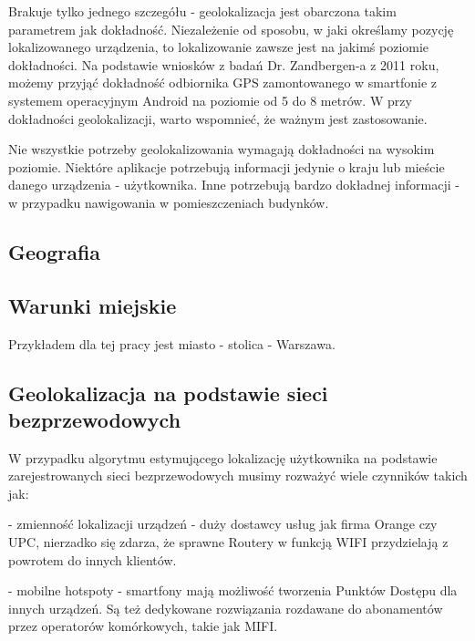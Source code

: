 Brakuje tylko jednego szczegółu - geolokalizacja jest obarczona takim parametrem jak dokładność. Niezależenie od sposobu, w jaki określamy pozycję lokalizowanego urządzenia, to lokalizowanie zawsze jest na jakimś poziomie dokładności. Na podstawie wniosków z badań Dr. Zandbergen-a z 2011 roku, możemy przyjąć dokładność odbiornika GPS zamontowanego w smartfonie z systemem operacyjnym Android na poziomie od 5 do 8 metrów.\cite{GpsAccurancyZandbergen} W przy dokładności geolokalizacji, warto wspomnieć, że ważnym jest zastosowanie. 

Nie wszystkie potrzeby geolokalizowania wymagają dokładności na wysokim poziomie. Niektóre aplikacje potrzebują informacji jedynie o kraju lub mieście danego urządzenia - użytkownika. Inne potrzebują bardzo dokładnej informacji - w przypadku nawigowania w pomieszczeniach budynków.%


\subsection{Geografia}

\subsection{Warunki miejskie}
Przykładem dla tej pracy jest miasto - stolica - Warszawa. 

\subsection{Geolokalizacja na podstawie sieci bezprzewodowych}
W przypadku algorytmu estymującego lokalizację użytkownika na podstawie zarejestrowanych sieci bezprzewodowych musimy rozważyć wiele czynników takich jak:

- zmienność lokalizacji urządzeń - duży dostawcy usług jak firma Orange czy UPC, nierzadko się zdarza, że sprawne Routery w funkcją WIFI przydzielają z powrotem do innych klientów.

- mobilne hotspoty - smartfony mają możliwość tworzenia Punktów Dostępu dla innych urządzeń. Są też dedykowane rozwiązania rozdawane do abonamentów przez operatorów komórkowych, takie jak MIFI.


